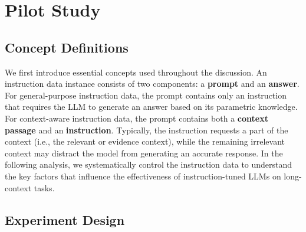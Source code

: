 \section{Pilot Study}
\label{sec:pilot_study}

\subsection{Concept Definitions}
We first introduce essential concepts used throughout the discussion.
An instruction data instance consists of two components: a \textbf{prompt} and an \textbf{answer}.
For general-purpose instruction data, the prompt contains only an instruction that requires the LLM to generate an answer based on its parametric knowledge.
For context-aware instruction data, the prompt contains both a \textbf{context passage} and an \textbf{instruction}.
Typically, the instruction requests a part of the context (i.e., the relevant or evidence context), while the remaining irrelevant context may distract the model from generating an accurate response.
In the following analysis, we systematically control the instruction data to understand the key factors that influence the effectiveness of instruction-tuned LLMs on long-context tasks.

\subsection{Experiment Design}

